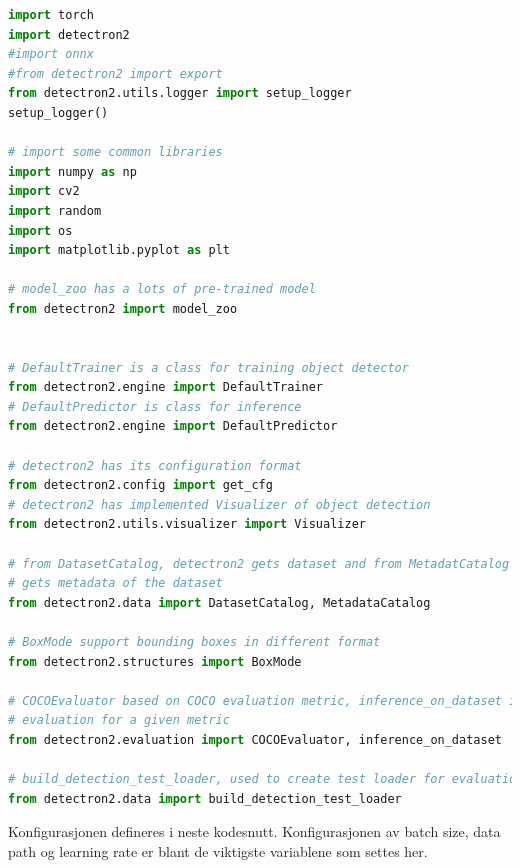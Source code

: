 \begin{lstlisting}[language=Python, caption=Her lastes bibliotekene inn i train.py for detectron2]
import torch
import detectron2
#import onnx
#from detectron2 import export
from detectron2.utils.logger import setup_logger
setup_logger()

# import some common libraries
import numpy as np
import cv2
import random
import os
import matplotlib.pyplot as plt

# model_zoo has a lots of pre-trained model
from detectron2 import model_zoo


# DefaultTrainer is a class for training object detector
from detectron2.engine import DefaultTrainer
# DefaultPredictor is class for inference
from detectron2.engine import DefaultPredictor

# detectron2 has its configuration format
from detectron2.config import get_cfg
# detectron2 has implemented Visualizer of object detection
from detectron2.utils.visualizer import Visualizer

# from DatasetCatalog, detectron2 gets dataset and from MetadatCatalog it
# gets metadata of the dataset
from detectron2.data import DatasetCatalog, MetadataCatalog

# BoxMode support bounding boxes in different format
from detectron2.structures import BoxMode

# COCOEvaluator based on COCO evaluation metric, inference_on_dataset is used for
# evaluation for a given metric
from detectron2.evaluation import COCOEvaluator, inference_on_dataset

# build_detection_test_loader, used to create test loader for evaluation
from detectron2.data import build_detection_test_loader

\end{lstlisting}

Konfigurasjonen defineres i neste kodesnutt. Konfigurasjonen av batch size, data path og learning rate er blant de viktigste variablene som settes her.

